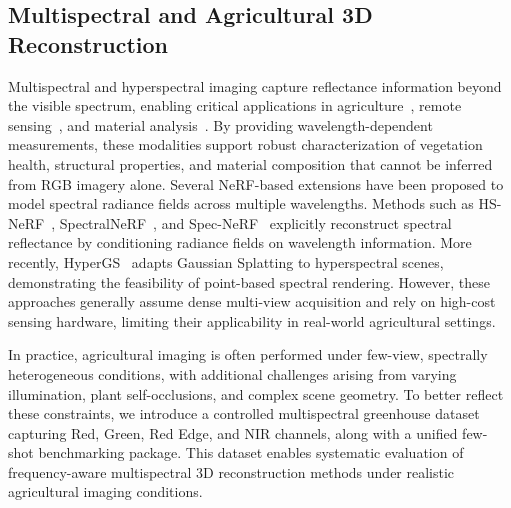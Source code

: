 \subsection{Multispectral and Agricultural 3D Reconstruction}

Multispectral and hyperspectral imaging capture reflectance information beyond the visible spectrum, enabling critical applications in agriculture~\cite{karukayil20253d}, remote sensing~\cite{ziemann2025new,nia2025neighborhood}, and material analysis~\cite{klein2023physics}. By providing wavelength-dependent measurements, these modalities support robust characterization of vegetation health, structural properties, and material composition that cannot be inferred from RGB imagery alone. Several NeRF-based extensions have been proposed to model spectral radiance fields across multiple wavelengths. Methods such as HS-NeRF~\cite{chen2024hyperspectral}, SpectralNeRF~\cite{li2024spectralnerf}, and Spec-NeRF~\cite{li2024spec} explicitly reconstruct spectral reflectance by conditioning radiance fields on wavelength information. More recently, HyperGS~\cite{thirgood2025hypergs} adapts Gaussian Splatting to hyperspectral scenes, demonstrating the feasibility of point-based spectral rendering. However, these approaches generally assume dense multi-view acquisition and rely on high-cost sensing hardware, limiting their applicability in real-world agricultural settings.

In practice, agricultural imaging is often performed under few-view, spectrally heterogeneous conditions, with additional challenges arising from varying illumination, plant self-occlusions, and complex scene geometry. To better reflect these constraints, we introduce a controlled multispectral greenhouse dataset capturing Red, Green, Red Edge, and NIR channels, along with a unified few-shot benchmarking package. This dataset enables systematic evaluation of frequency-aware multispectral 3D reconstruction methods under realistic agricultural imaging conditions.

